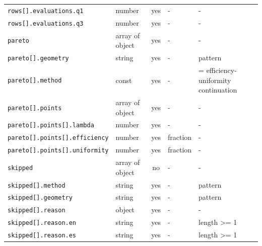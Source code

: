 \begin{longtable}{@{}l l c l l@{}}
\texttt{rows[].evaluations.q1} & number & yes & - & -\\
\texttt{rows[].evaluations.q3} & number & yes & - & -\\
\texttt{pareto} & array of object & yes & - & -\\
\texttt{pareto[].geometry} & string & yes & - & pattern\\
\texttt{pareto[].method} & const & yes & - & = efficiency-uniformity continuation\\
\texttt{pareto[].points} & array of object & yes & - & -\\
\texttt{pareto[].points[].lambda} & number & yes & - & -\\
\texttt{pareto[].points[].efficiency} & number & yes & fraction & -\\
\texttt{pareto[].points[].uniformity} & number & yes & fraction & -\\
\texttt{skipped} & array of object & no & - & -\\
\texttt{skipped[].method} & string & yes & - & pattern\\
\texttt{skipped[].geometry} & string & yes & - & pattern\\
\texttt{skipped[].reason} & object & yes & - & -\\
\texttt{skipped[].reason.en} & string & yes & - & length >= 1\\
\texttt{skipped[].reason.es} & string & yes & - & length >= 1\\
\bottomrule\end{longtable}
\endgroup

